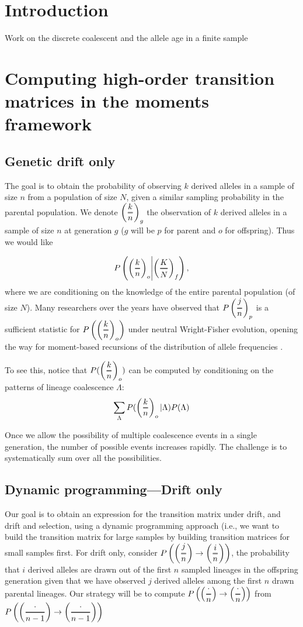 \documentclass[]{article}
\newcommand{\Dfrac}[2]{%
  \left(
  \ooalign{%
    $\genfrac{}{}{1.2pt}0{#1}{#2}$\cr%
    $\color{white}\genfrac{}{}{.4pt}0{\phantom{#1}}{\phantom{#2}}$}%
  \right)
}
\begin{document}
\section{Introduction}
\label{sec:intro}

Work on the discrete coalescent and the allele age in a finite sample
\section{Computing high-order transition matrices in the moments framework}
\subsection{Genetic drift only}
The goal is to obtain the probability of observing $k$ derived alleles in a sample of size $n$ from a population of size $N$, given a similar sampling probability in the parental population. We denote $\Dfrac{k}{n}_g$ the observation of $k$ derived alleles in a sample of size $n$ at generation $g$ ($g$ will be $p$ for parent and $o$ for offspring).  Thus we would like 

$$P\left(\Dfrac{k}{n}_o \middle|  \Dfrac{K}{N}_f \right),$$ where we are conditioning on the knowledge of the entire parental population (of size $N$). Many researchers over the years have observed that $P\Dfrac{j}{n}_p$ is a sufficient statistic for  $P\left(\Dfrac{k}{n}_o\right)$ under neutral Wright-Fisher evolution, opening the way for moment-based recursions of the distribution of allele frequencies \cite{Kimura, Ewens, Song, Jouganous, Kurtz-Donnely}.

To see this, notice that $P(\Dfrac{k}{n}_o)$ can be computed by conditioning on the patterns of lineage coalescence $\Lambda$:
$$\sum_\Lambda P(\Dfrac{k}{n}_o | \Lambda) P(\Lambda)$$


 

Once we allow the possibility of multiple coalescence events in a single generation, the number of possible events increases rapidly. The challenge is to systematically sum over all the possibilities. 

\subsection{Dynamic programming---Drift only}
Our goal is to obtain an expression for the transition matrix under drift, and drift and selection, using a dynamic programming approach (i.e., we want to build the transition matrix for large samples by building transition matrices for small samples first. For drift only, consider $P\left(\Dfrac{j}{n} \rightarrow \Dfrac{i}{n} \right)$, the probability that $i$ derived alleles are drawn out of the first $n$ sampled lineages in the offspring generation given that we have observed $j$ derived alleles among the first $n$ drawn parental lineages. Our strategy will be to compute $P\left(\Dfrac{\cdot}{n} \rightarrow \Dfrac{\cdot}{n} \right)$ from $P\left(\Dfrac{\cdot}{n-1} \rightarrow \Dfrac{\cdot}{n-1} \right)$
\end{document}

